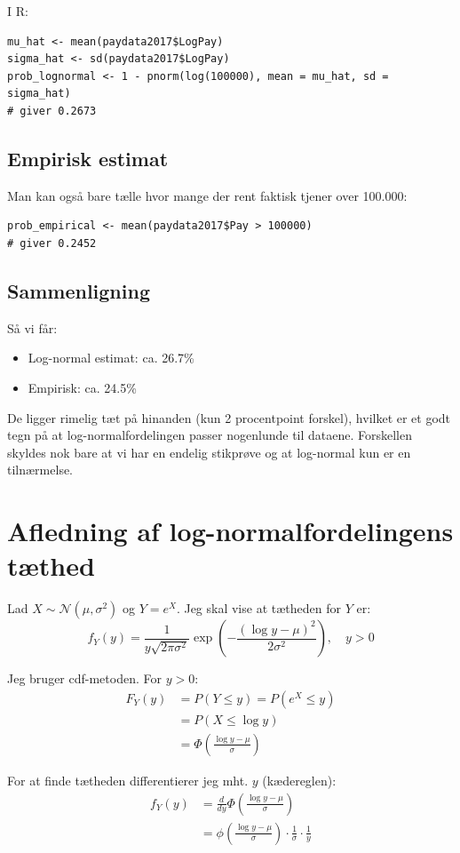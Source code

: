 \documentclass[11pt,a4paper]{article}
\begin{document}
I R:
\begin{lstlisting}
mu_hat <- mean(paydata2017$LogPay)
sigma_hat <- sd(paydata2017$LogPay)
prob_lognormal <- 1 - pnorm(log(100000), mean = mu_hat, sd = sigma_hat)
# giver 0.2673
\end{lstlisting}

\subsection{Empirisk estimat}

Man kan også bare tælle hvor mange der rent faktisk tjener over 100.000:
\begin{lstlisting}
prob_empirical <- mean(paydata2017$Pay > 100000)
# giver 0.2452
\end{lstlisting}

\subsection{Sammenligning}

Så vi får:
\begin{itemize}
    \item Log-normal estimat: ca. 26.7\%
    \item Empirisk: ca. 24.5\%
\end{itemize}

De ligger rimelig tæt på hinanden (kun 2 procentpoint forskel), hvilket er et godt tegn på at log-normalfordelingen passer nogenlunde til dataene. Forskellen skyldes nok bare at vi har en endelig stikprøve og at log-normal kun er en tilnærmelse.

\section{Afledning af log-normalfordelingens tæthed}

Lad $X \sim \mathcal{N}(\mu, \sigma^2)$ og $Y = e^X$. Jeg skal vise at tætheden for $Y$ er:
\[
f_Y(y) = \frac{1}{y\sqrt{2\pi\sigma^2}} \exp\left(-\frac{(\log y - \mu)^2}{2\sigma^2}\right), \quad y > 0
\]

Jeg bruger cdf-metoden. For $y > 0$:
\begin{align}
F_Y(y) &= P(Y \leq y) = P(e^X \leq y) \nonumber \\
&= P(X \leq \log y) \nonumber \\
&= \Phi\left(\frac{\log y - \mu}{\sigma}\right)
\end{align}

For at finde tætheden differentierer jeg mht. $y$ (kædereglen):
\begin{align}
f_Y(y) &= \frac{d}{dy} \Phi\left(\frac{\log y - \mu}{\sigma}\right) \nonumber \\
&= \phi\left(\frac{\log y - \mu}{\sigma}\right) \cdot \frac{1}{\sigma} \cdot \frac{1}{y}
\end{align}
\end{document}
